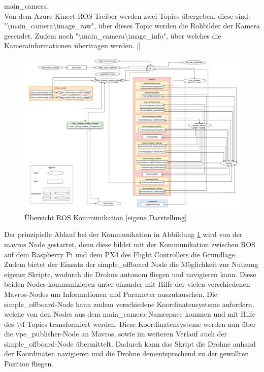 main\_camera: \\
Von dem Azure Kinect ROS Treiber werden zwei Topics übergeben, diese sind: \\
"\textbackslash main\_camera\textbackslash image\_raw", über dieses Topic werden die Rohbilder der Kamera gesendet. Zudem noch "\textbackslash main\_camera\textbackslash image\_info", über welches die Kamerainformationen übertragen werden. []\\


    \begin{landscape}
        \begin{figure}
            \includegraphics[width=\paperwidth,keepaspectratio]{images/graph_ros.pdf}
            \caption[Übersicht ROS Kommunikation]{\label{img ros_communication} Übersicht ROS Kommunikation [eigene Darstellung]}
        \end{figure}
    \end{landscape}


Der prinzipielle Ablauf bei der Kommunikation in Abbildung \ref{img ros_communication} wird von der mavros Node gestartet, denn diese bildet mit der Kommunikation zwischen ROS auf dem Raspberry Pi und dem PX4 des Flight Controllers die Grundlage. Zudem bietet der Einsatz der simple\_offboard Node die Möglichkeit zur Nutzung eigener Skripte, wodurch die Drohne autonom fliegen und navigieren kann. Diese beiden Nodes kommunizieren unter einander mit Hilfe der vielen verschiedenen Mavros-Nodes um Informationen und Parameter auszutauschen. Die simple\_offboard-Node kann zudem verschiedene Koordinatensysteme anfordern, welche von den Nodes aus dem main\_camera-Namespace kommen und mit Hilfe des \textbackslash tf-Topics transformiert werden. Diese Koordinatensysteme werden nun über die vpe\_publisher-Node an Mavros, sowie im weiteren Verlauf auch der simple\_offboard-Node übermittelt. Dadurch kann das Skript die Drohne anhand der Koordinaten navigieren und die Drohne dementsprechend zu der gewollten Position fliegen.

